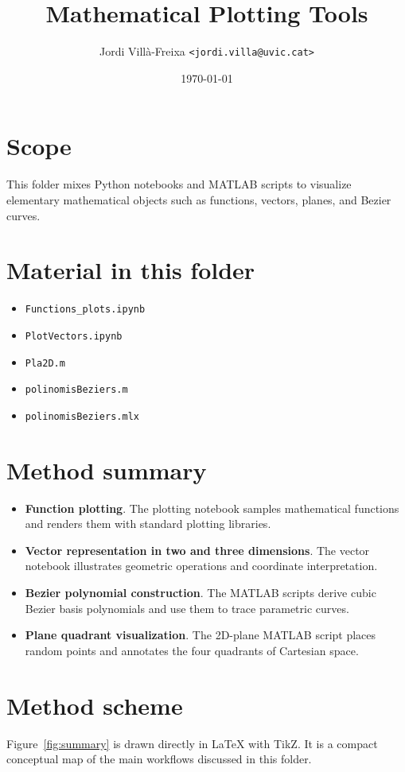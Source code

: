 \documentclass[11pt,a4paper]{article}
\title{Mathematical Plotting Tools}
\author{Jordi Vill\`a-Freixa \texttt{<jordi.villa@uvic.cat>}}
\date{\today}
\begin{document}
    \maketitle

    \section*{Scope}
    This folder mixes Python notebooks and MATLAB scripts to visualize elementary mathematical objects such as functions, vectors, planes, and Bezier curves.

    \section*{Material in this folder}
    \begin{itemize}[leftmargin=*]
\item \texttt{Functions\_plots.ipynb}
\item \texttt{PlotVectors.ipynb}
\item \texttt{Pla2D.m}
\item \texttt{polinomisBeziers.m}
\item \texttt{polinomisBeziers.mlx}
    \end{itemize}

    \section*{Method summary}
    \begin{itemize}[leftmargin=*]
\item \textbf{Function plotting}. The plotting notebook samples mathematical functions and renders them with standard plotting libraries.
\item \textbf{Vector representation in two and three dimensions}. The vector notebook illustrates geometric operations and coordinate interpretation.
\item \textbf{Bezier polynomial construction}. The MATLAB scripts derive cubic Bezier basis polynomials and use them to trace parametric curves.
\item \textbf{Plane quadrant visualization}. The 2D-plane MATLAB script places random points and annotates the four quadrants of Cartesian space.
    \end{itemize}

    \section*{Method scheme}
    Figure~\ref{fig:summary} is drawn directly in LaTeX with TikZ. It is a compact conceptual map of the main workflows discussed in this folder.
\end{document}
